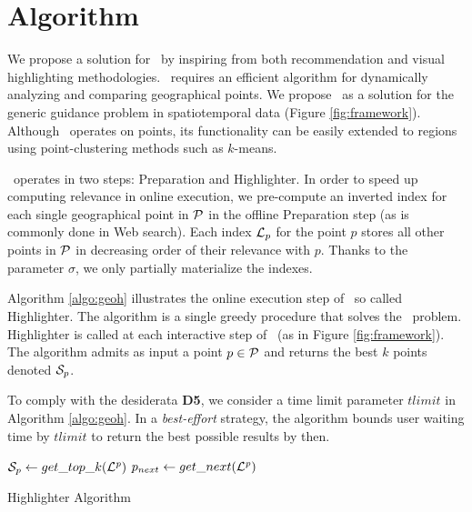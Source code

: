 \section{Algorithm}
\label{sec:algo}
We propose a solution for \pb\ by inspiring from both recommendation \cite{Omidvar-Tehrani:2015} and
visual highlighting
\cite{Liang2010,Robinson2011}
methodologies. \pb\ requires an efficient algorithm for dynamically analyzing and comparing geographical points. We propose \framework\ as a solution for the generic guidance problem in spatiotemporal data (Figure \ref{fig:framework}). Although \framework\ operates on points, its functionality can be easily extended to regions using point-clustering methods such as $k$-means.

\framework\ operates in two steps: {\sc Preparation} and {\sc Highlighter}. In order to speed up computing relevance in online execution, we pre-compute an inverted index for each single geographical point in ${\cal P}$ in the offline {\sc Preparation} step (as is commonly done in Web search). Each index ${\cal L}_p$ for the point $p$ stores all other points in ${\cal P}$ in decreasing order of their relevance with $p$. Thanks to the parameter $\sigma$, we only partially materialize the indexes.


Algorithm \ref{algo:geoh} illustrates the online execution step of \framework\, so called {\sc Highlighter}. The algorithm is a single greedy procedure that solves the \pb\ problem. {\sc Highlighter} is called at each interactive step of \framework\ (as in Figure \ref{fig:framework}). The algorithm admits as input a point $p \in {\cal P}$ and returns the best $k$ points denoted ${\cal S}_p$.

To comply with the desiderata {\bf D5}, we consider a time limit parameter $tlimit$ in Algorithm \ref{algo:geoh}. In a {\em best-effort} strategy, the algorithm bounds user waiting time by $tlimit$ to return the best possible results by then.

\begin{algorithm}[t]
\DontPrintSemicolon
{}
${\cal S}_p \gets get\_top\_k(\mathit{{\cal L}^p})$\;\label{cd:gettopk}
$p_{next} \gets get\_next(\mathit{{\cal L}^p})$\;\label{cd:getnext}
\label{cd:endwhile}
\; 
\caption{{\sc Highlighter} Algorithm}
\label{algo:geoh}
\end{algorithm}

